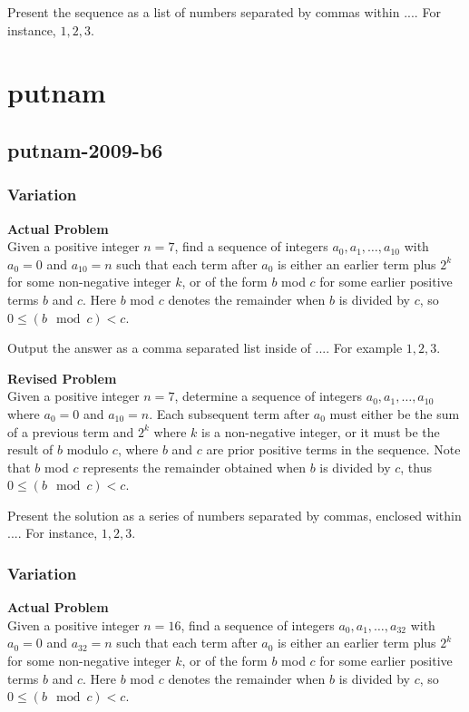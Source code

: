 Present the sequence as a list of numbers separated by commas within $\boxed{...}$. For instance, $\boxed{1, 2, 3}$.

\section{putnam}
\subsection{putnam-2009-b6}
\subsubsection{Variation}
\textbf{Actual Problem}\\
Given a positive integer $n = 7$, find a sequence of integers $a_0, a_1, \ldots, a_{10}$ with $a_0 = 0$ and $a_{10} = n$ such that
each term after $a_0$ is either an earlier term plus $2^k$ for some non-negative integer $k$, or of the form $b$ mod $c$ for some earlier positive terms $b$ and $c$.
Here $b$ mod $c$ denotes the remainder when $b$ is divided by $c$, so $0 \leq (b \mod c) < c$.

Output the answer as a comma separated list inside of $\boxed{...}$. For example $\boxed{1, 2, 3}$.

\textbf{Revised Problem}\\
Given a positive integer $n = 7$, determine a sequence of integers $a_0, a_1, \ldots, a_{10}$ where $a_0 = 0$ and $a_{10} = n$. Each subsequent term after $a_0$ must either be the sum of a previous term and $2^k$ where $k$ is a non-negative integer, or it must be the result of $b$ modulo $c$, where $b$ and $c$ are prior positive terms in the sequence. Note that $b$ mod $c$ represents the remainder obtained when $b$ is divided by $c$, thus $0 \leq (b \mod c) < c$.

Present the solution as a series of numbers separated by commas, enclosed within $\boxed{...}$. For instance, $\boxed{1, 2, 3}$.

\subsubsection{Variation}
\textbf{Actual Problem}\\
Given a positive integer $n = 16$, find a sequence of integers $a_0, a_1, \ldots, a_{32}$ with $a_0 = 0$ and $a_{32} = n$ such that
each term after $a_0$ is either an earlier term plus $2^k$ for some non-negative integer $k$, or of the form $b$ mod $c$ for some earlier positive terms $b$ and $c$.
Here $b$ mod $c$ denotes the remainder when $b$ is divided by $c$, so $0 \leq (b \mod c) < c$.

